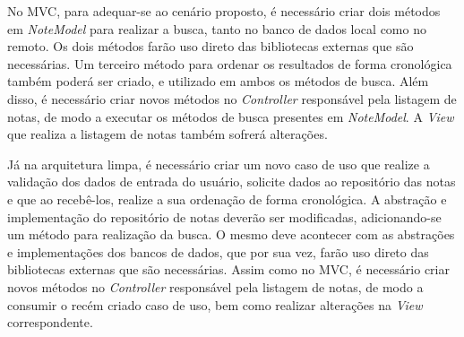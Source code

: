 No MVC, para adequar-se ao cenário proposto, é necessário criar dois métodos em \emph{NoteModel} para realizar a busca, tanto no banco de dados local como no remoto.
Os dois métodos farão uso direto das bibliotecas externas que são necessárias.
Um terceiro método para ordenar os resultados de forma cronológica também poderá ser criado, e utilizado em ambos os métodos de busca.
Além disso, é necessário criar novos métodos no \emph{Controller} responsável pela listagem de notas, de modo a executar os métodos de busca presentes em \emph{NoteModel}.
A \emph{View} que realiza a listagem de notas também sofrerá alterações.

Já na arquitetura limpa, é necessário criar um novo caso de uso que realize a validação dos dados de entrada do usuário, solicite dados ao repositório das notas e que ao recebê-los, realize a sua ordenação de forma cronológica.
A abstração e implementação do repositório de notas deverão ser modificadas, adicionando-se um método para realização da busca.
O mesmo deve acontecer com as abstrações e implementações dos bancos de dados, que por sua vez, farão uso direto das bibliotecas externas que são necessárias.
Assim como no MVC, é necessário criar novos métodos no \emph{Controller} responsável pela listagem de notas, de modo a consumir o recém criado caso de uso, bem como realizar alterações na \emph{View} correspondente.